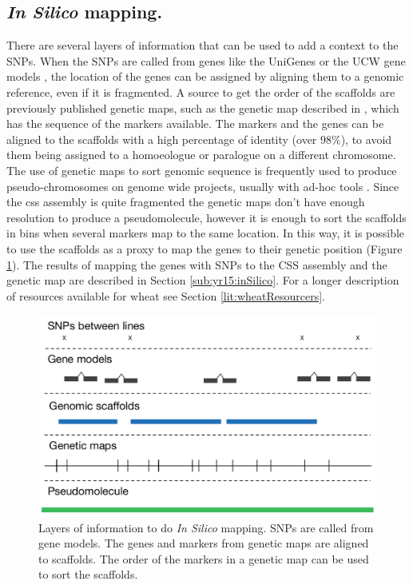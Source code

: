 \subsection{\textit{In Silico} mapping.}
There are several layers of information that can be used to add a context to the SNPs. 
When the SNPs are called from genes like the UniGenes \citep{PontiusJUWagnerL2002} or the UCW gene models \citep{Krasileva2013}, the location of the genes can be assigned by aligning them to a genomic reference, even if it is fragmented. 
A source to get the order of the scaffolds are previously published genetic maps, such as the genetic map described in \citet{Wang2014}, which has the sequence of the markers available.
The markers and the genes can be aligned to the scaffolds with a high percentage of identity (over $98\%$), to avoid them being assigned to a homoeologue or paralogue on a different chromosome.
The use of genetic maps to sort genomic sequence is frequently used to produce pseudo-chromosomes on genome wide projects, usually with ad-hoc tools \citep{Tang2015}.
Since the \acrshort{css} assembly is quite fragmented the genetic maps don't have enough resolution to produce a pseudomolecule, however it is enough to sort the scaffolds in bins when several markers map to the same location. 
In this way, it is possible to use the scaffolds as a proxy to map the genes to their genetic position (Figure \ref{fig:yr15:layersOfMapping}).
The results of mapping the genes with SNPs to the CSS assembly and the genetic map are described in Section \ref{sub:yr15:inSilico}. 
For a longer description of resources available for wheat see Section \ref{lit:wheatResourcers}. 

\begin{figure}
  \centering
  \includegraphics[width=1\textwidth]{Yr15/Figures/mapping/layersOfMapping.pdf}
  \caption[Layers of information to do \textit{In Silico} mapping.]{Layers of information to do \textit{In Silico} mapping. SNPs are called from gene models. The genes and markers from genetic maps are aligned to scaffolds. The order of the markers in a genetic map can be used to sort the scaffolds.} 
  \label{fig:yr15:layersOfMapping}
\end{figure}

